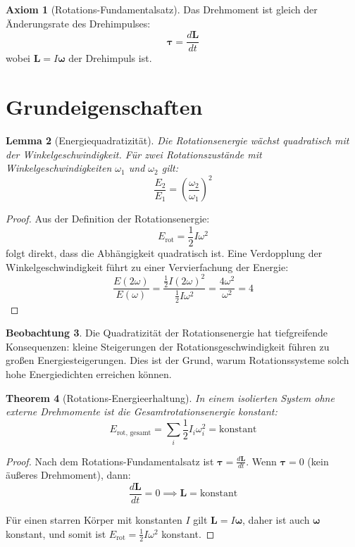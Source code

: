 \documentclass[12pt,a4paper]{report}
\theoremstyle{plain}
\newtheorem{theorem}{Theorem}[section]
\newtheorem{lemma}[theorem]{Lemma}
\theoremstyle{definition}
\newtheorem{axiom}[theorem]{Axiom}
\newtheorem{beobachtung}[theorem]{Beobachtung}
\theoremstyle{remark}
\begin{document}
\begin{axiom}[Rotations-Fundamentalsatz]
	Das Drehmoment ist gleich der Änderungsrate des Drehimpulses:
	\[
	\boldsymbol{\tau} = \frac{d\mathbf{L}}{dt}
	\]
	wobei $\mathbf{L} = I \boldsymbol{\omega}$ der Drehimpuls ist.
\end{axiom}

\section{Grundeigenschaften}

\begin{lemma}[Energiequadratizität]
	\label{lem:quadratizitaet}
	Die Rotationsenergie wächst quadratisch mit der Winkelgeschwindigkeit. Für zwei Rotationszustände mit Winkelgeschwindigkeiten $\omega_1$ und $\omega_2$ gilt:
	\[
	\frac{E_2}{E_1} = \left(\frac{\omega_2}{\omega_1}\right)^2
	\]
\end{lemma}

\begin{proof}
	Aus der Definition der Rotationsenergie:
	\[
	E_{\text{rot}} = \frac{1}{2} I \omega^2
	\]
	folgt direkt, dass die Abhängigkeit quadratisch ist. Eine Verdopplung der Winkelgeschwindigkeit führt zu einer Vervierfachung der Energie:
	\[
	\frac{E(2\omega)}{E(\omega)} = \frac{\frac{1}{2} I (2\omega)^2}{\frac{1}{2} I \omega^2} = \frac{4\omega^2}{\omega^2} = 4
	\]
\end{proof}

\begin{beobachtung}
	Die Quadratizität der Rotationsenergie hat tiefgreifende Konsequenzen: kleine Steigerungen der Rotationsgeschwindigkeit führen zu großen Energiesteigerungen. Dies ist der Grund, warum Rotationssysteme solch hohe Energiedichten erreichen können.
\end{beobachtung}

\begin{theorem}[Rotations-Energieerhaltung]
	\label{thm:energieerhaltung}
	In einem isolierten System ohne externe Drehmomente ist die Gesamtrotationsenergie konstant:
	\[
	E_{\text{rot, gesamt}} = \sum_i \frac{1}{2} I_i \omega_i^2 = \text{konstant}
	\]
\end{theorem}

\begin{proof}
	Nach dem Rotations-Fundamentalsatz ist $\boldsymbol{\tau} = \frac{d\mathbf{L}}{dt}$. Wenn $\boldsymbol{\tau} = 0$ (kein äußeres Drehmoment), dann:
	\[
	\frac{d\mathbf{L}}{dt} = 0 \implies \mathbf{L} = \text{konstant}
	\]
	
	Für einen starren Körper mit konstanten $I$ gilt $\mathbf{L} = I\boldsymbol{\omega}$, daher ist auch $\boldsymbol{\omega}$ konstant, und somit ist $E_{\text{rot}} = \frac{1}{2}I\omega^2$ konstant.
\end{proof}
\end{document}
